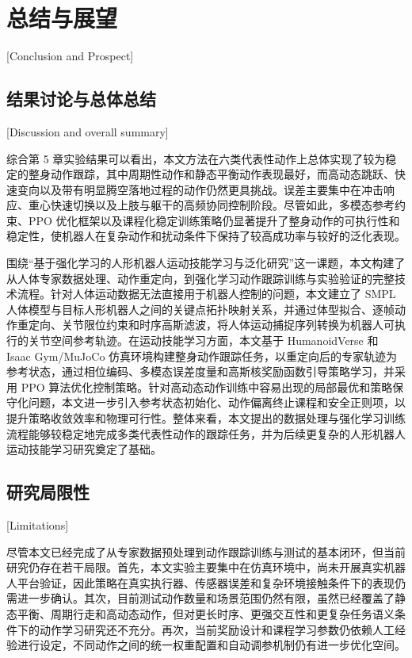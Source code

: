 
\chapter{总结与展望}[Conclusion and Prospect]

\section{结果讨论与总体总结}[Discussion and overall summary]

综合第 5 章实验结果可以看出，本文方法在六类代表性动作上总体实现了较为稳定的整身动作跟踪，其中周期性动作和静态平衡动作表现最好，而高动态跳跃、快速变向以及带有明显腾空落地过程的动作仍然更具挑战。误差主要集中在冲击响应、重心快速切换以及上肢与躯干的高频协同控制阶段。尽管如此，多模态参考约束、PPO 优化框架以及课程化稳定训练策略仍显著提升了整身动作的可执行性和稳定性，使机器人在复杂动作和扰动条件下保持了较高成功率与较好的泛化表现。

围绕“基于强化学习的人形机器人运动技能学习与泛化研究”这一课题，本文构建了从人体专家数据处理、动作重定向，到强化学习动作跟踪训练与实验验证的完整技术流程。针对人体运动数据无法直接用于机器人控制的问题，本文建立了 SMPL 人体模型与目标人形机器人之间的关键点拓扑映射关系，并通过体型拟合、逐帧动作重定向、关节限位约束和时序高斯滤波，将人体运动捕捉序列转换为机器人可执行的关节空间参考轨迹。在运动技能学习方面，本文基于 HumanoidVerse 和 Isaac Gym/MuJoCo 仿真环境构建整身动作跟踪任务，以重定向后的专家轨迹为参考状态，通过相位编码、多模态误差度量和高斯核奖励函数引导策略学习，并采用 PPO 算法优化控制策略。针对高动态动作训练中容易出现的局部最优和策略保守化问题，本文进一步引入参考状态初始化、动作偏离终止课程和安全正则项，以提升策略收敛效率和物理可行性。整体来看，本文提出的数据处理与强化学习训练流程能够较稳定地完成多类代表性动作的跟踪任务，并为后续更复杂的人形机器人运动技能学习研究奠定了基础。

\section{研究局限性}[Limitations]

尽管本文已经完成了从专家数据预处理到动作跟踪训练与测试的基本闭环，但当前研究仍存在若干局限。首先，本文实验主要集中在仿真环境中，尚未开展真实机器人平台验证，因此策略在真实执行器、传感器误差和复杂环境接触条件下的表现仍需进一步确认。其次，目前测试动作数量和场景范围仍然有限，虽然已经覆盖了静态平衡、周期行走和高动态动作，但对更长时序、更强交互性和更复杂任务语义条件下的动作学习研究还不充分。再次，当前奖励设计和课程学习参数仍依赖人工经验进行设定，不同动作之间的统一权重配置和自动调参机制仍有进一步优化空间。

